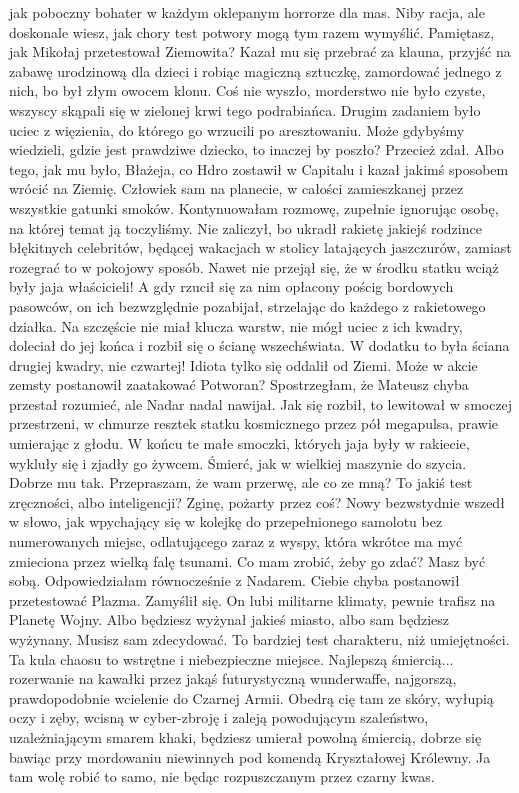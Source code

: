 \begin{dialogue}
jak poboczny bohater w każdym oklepanym horrorze dla mas.
\ds{} Niby racja, ale doskonale wiesz, jak chory test potwory mogą tym razem wymyślić.
Pamiętasz, jak Mikołaj przetestował Ziemowita? Kazał mu się przebrać za klauna, przyjść na zabawę urodzinową dla dzieci i robiąc magiczną sztuczkę, zamordować jednego z nich, bo był złym owocem klonu.
Coś nie wyszło, morderstwo nie było czyste, wszyscy skąpali się w zielonej krwi tego podrabiańca.
Drugim zadaniem było uciec z więzienia, do którego go wrzucili po aresztowaniu. Może gdybyśmy wiedzieli, gdzie jest prawdziwe dziecko, to inaczej by poszło?
\ds{} Przecież zdał.
\ds{} Albo tego, jak mu było, Błażeja, co Hdro zostawił w Capitalu i kazał jakimś sposobem wrócić na Ziemię.
Człowiek sam na planecie, w całości zamieszkanej przez wszystkie gatunki smoków.
\dm{} Kontynuowałam rozmowę, zupełnie ignorując osobę, na której temat ją toczyliśmy.
\ds{} Nie zaliczył, bo ukradł rakietę jakiejś rodzince błękitnych celebritów, będącej wakacjach w stolicy latających jaszczurów, zamiast rozegrać to w pokojowy sposób. 
Nawet nie przejął się, że w środku statku wciąż były jaja właścicieli!
A gdy rzucił się za nim opłacony pościg bordowych pasowców, on ich bezwzględnie pozabijał, strzelając do każdego z rakietowego działka.
Na szczęście nie miał klucza warstw, nie mógł uciec z ich kwadry, doleciał do jej końca i rozbił się o ścianę wszechświata. 
W dodatku to była ściana drugiej kwadry, nie czwartej! 
Idiota tylko się oddalił od Ziemi. Może w akcie zemsty postanowił zaatakować Potworan?
\dm{} Spostrzegłam, że Mateusz chyba przestał rozumieć, ale Nadar nadal nawijał. \dm{}
Jak się rozbił, to lewitował w smoczej przestrzeni, w chmurze resztek statku kosmicznego przez pół megapulsa, prawie umierając z głodu.
W końcu te małe smoczki, których jaja były w rakiecie, wykluły się i zjadły go żywcem. Śmierć, jak w wielkiej maszynie do szycia.
Dobrze mu tak.
\ds{} Przepraszam, że wam przerwę, ale co ze mną? To jakiś test zręczności, albo inteligencji? 
Zginę, pożarty przez coś? \dm{} Nowy bezwstydnie wszedł w słowo, jak wpychający się w kolejkę do przepełnionego samolotu bez numerowanych miejsc, 
odlatującego zaraz z wyspy, która wkrótce ma myć zmieciona przez wielką falę tsunami.
\dm{} Co mam zrobić, żeby go zdać?
\ds{} Masz być sobą. \dm{} Odpowiedziałam równocześnie z Nadarem.
\ds{} Ciebie chyba postanowił przetestować Plazma. \dm{} Zamyślił się. \dm{} On lubi militarne klimaty, pewnie trafisz na Planetę Wojny.
Albo będziesz wyżynał jakieś miasto, albo sam będziesz wyżynany. Musisz sam zdecydować.
To bardziej test charakteru, niż umiejętności. Ta kula chaosu to wstrętne i niebezpieczne miejsce.
Najlepszą śmiercią... rozerwanie na kawałki przez jakąś futurystyczną wunderwaffe, najgorszą, prawdopodobnie wcielenie do Czarnej Armii.
Obedrą cię tam ze skóry, wyłupią oczy i zęby, wcisną w cyber-zbroję i zaleją powodującym szaleństwo, uzależniającym smarem khaki, 
będziesz umierał powolną śmiercią, dobrze się bawiąc przy mordowaniu niewinnych pod komendą Kryształowej Królewny.
Ja tam wolę robić to samo, nie będąc rozpuszczanym przez czarny kwas.
\end{dialogue}

